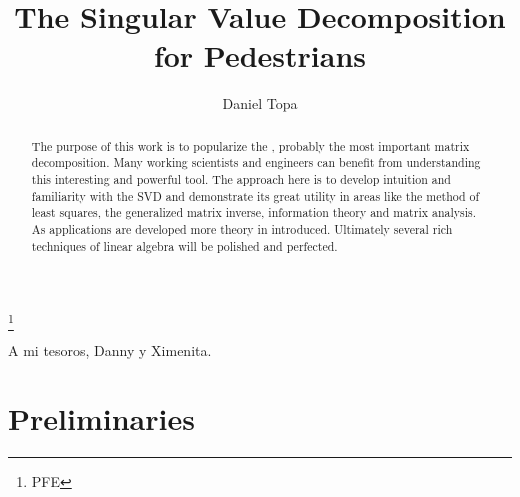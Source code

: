 \documentclass[theoremb]{gsm-l}
\begin{document}
\frontmatter

\title{The Singular Value Decomposition\\for Pedestrians}

\author{Daniel Topa}
\address{University of New Mexico\\Albuquerque, New Mexico}
\thanks{PFE}



\begin{abstract}
The purpose of this work is to popularize the \svdp, probably the most important matrix decomposition. Many working scientists and engineers can benefit from understanding this interesting and powerful tool. The approach here is to develop intuition and familiarity with the SVD and demonstrate its great utility in areas like the method of least squares, the generalized matrix inverse, information theory and matrix analysis. As applications are developed more theory in introduced. Ultimately several rich techniques of linear algebra will be polished and perfected.
\end{abstract}

\maketitle

\cleardoublepage
\thispagestyle{empty}
\vspace*{13.5pc}
\begin{center}
  A mi tesoros, Danny y Ximenita.
\end{center}
\cleardoublepage

\setcounter{page}{7}

\tableofcontents





\mainmatter

\part{Preliminaries}

\end{document}
